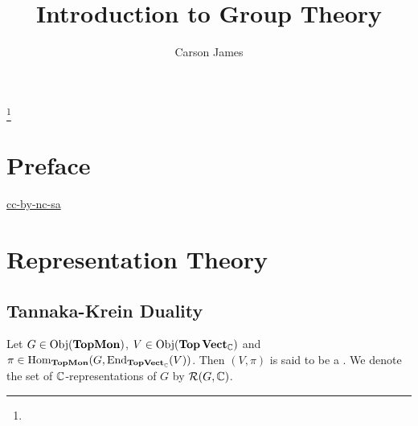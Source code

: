 \documentclass{book}
\begin{document}
	
	\frontmatter
	
	\title{Introduction to Group Theory}
	
	
	\author{Carson James}
	\thanks{}
	
	\date{}
	
	\maketitle
	
	
	\setcounter{page}{4}
	
	\tableofcontents
	\printunsrtglossary[type=symbols,style=long,title={Notation}]
	
	
	\mainmatter
	
	\chapter*{Preface}
	
	\begin{flushleft}
		\href{https://creativecommons.org/licenses/by-nc-sa/4.0/legalcode.txt}{cc-by-nc-sa}
	\end{flushleft}
	
	\newpage
	
	
	\chapter{Representation Theory}
	
	\section{Tannaka-Krein Duality}
	
	\begin{defn}
		Let $G \in \operatorname{Obj}(\operatorname*{\text{\textbf{TopMon}}})$, $V \in \operatorname{Obj}(\operatorname*{\text{\textbf{Top}}}\operatorname*{\text{\textbf{Vect}}}_{\mathbb{C}})$ and $\pi \in \operatorname{Hom}_{\operatorname*{\text{\textbf{TopMon}}}}(G, \operatorname{\text{End}}_{\operatorname*{\text{\textbf{TopVect}}}_{\mathbb{C}}}(V))$. Then $(V, \pi)$ is said to be a .  We denote the set of $\mathbb{C}$-representations of $G$ by $\mathcal{R}(G, \mathbb{C})$.
	\end{defn}
\end{document}
